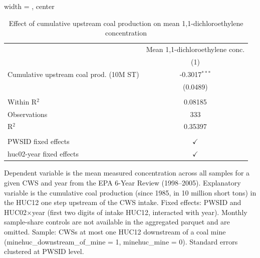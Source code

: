
\begin{table}[htbp]
   
   \caption{\label{tab:6yr_huc02fe_1_1_dichloroethylene_mean} Effect of cumulative upstream coal production on mean 1,1-dichloroethylene concentration}
   \bigskip
   
   \centering
   
   \begin{adjustbox}{width = \textwidth, center}
      
      
      \begin{tabular}{lc}
         \toprule
         
                                                 & Mean 1,1-dichloroethylene conc.\\  
         
                                                 & (1)\\  
         
         \midrule 
         Cumulative upstream coal prod. (10M ST) & -0.3017$^{***}$\\   
                                                 & (0.0489)\\   
         
          \\
         
         Within R$^2$                            & 0.08185\\  
         Observations                            & 333\\  
         R$^2$                                   & 0.35397\\  
         
          \\
         
         PWSID fixed effects                     & $\checkmark$\\   
         huc02-year fixed effects                & $\checkmark$\\   
         
         \bottomrule
         
      \end{tabular}
      
      
      
   \end{adjustbox}
      {\tiny\linespread{1}\selectfont \par \raggedright 
   Dependent variable is the mean measured concentration across all samples for a given CWS and year from the EPA 6-Year Review (1998--2005). Explanatory variable is the cumulative coal production (since 1985, in 10 million short tons) in the HUC12 one step upstream of the CWS intake. Fixed effects: PWSID and HUC02$\times$year (first two digits of intake HUC12, interacted with year). Monthly sample-share controls are not available in the aggregated parquet and are omitted. Sample: CWSs at most one HUC12 downstream of a coal mine (minehuc\_downstream\_of\_mine = 1, minehuc\_mine = 0). Standard errors clustered at PWSID level.}
   
\end{table}


